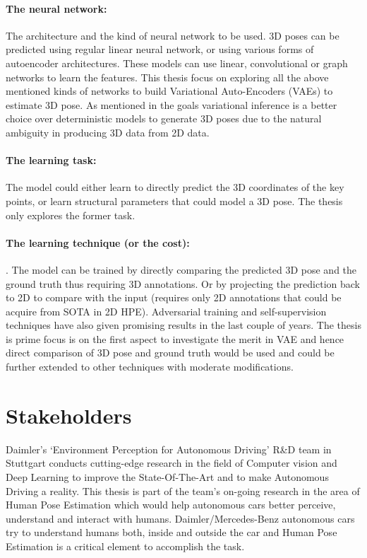 \paragraph{The neural network:} The architecture and the kind of neural network to be used. 3D poses can be predicted using regular linear neural network, or using various forms of autoencoder architectures. These models can use linear, convolutional or graph networks to learn the features. This thesis focus on exploring all the above mentioned kinds of networks to build Variational Auto-Encoders (\ac{VAE}s) to estimate 3D pose. As mentioned in the goals variational inference is a better choice over deterministic models to generate 3D poses due to the natural ambiguity in producing 3D data from 2D data.  

\paragraph{The learning task:} The model could either learn to directly predict the 3D coordinates of the key points, or learn structural parameters that could model a 3D pose. The thesis only explores the former task.

\paragraph{The learning technique (or the cost):}. The model can be trained by directly comparing the predicted 3D pose and the ground truth thus requiring 3D annotations. Or by projecting the prediction back to 2D to compare with the input (requires only 2D annotations that could be acquire from \ac{SOTA} in 2D \ac{HPE}). Adversarial training and self-supervision techniques have also given promising results in the last couple of years. The thesis is prime focus is on the first aspect to investigate the merit in \ac{VAE} and hence direct comparison of 3D pose and ground truth would be used and could be further extended to other techniques with moderate modifications.


\section{Stakeholders}
Daimler’s ‘Environment Perception for Autonomous Driving’ R\&D team in Stuttgart conducts cutting-edge research in the field of Computer vision and Deep Learning to improve the State-Of-The-Art and to make Autonomous Driving a reality. This thesis is part of the team’s on-going research in the area of Human Pose Estimation which would help autonomous cars better perceive, understand and interact with humans. Daimler/Mercedes-Benz autonomous cars try to understand humans both, inside and outside the car and Human Pose Estimation is a critical element to accomplish the task.

